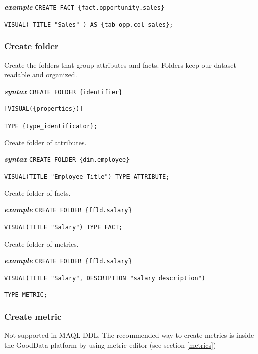 \documentclass[a4paper, 12pt, titlepage, fleqn]{article}
\begin{document}
\textbf{\emph{example}}  \hspace{.9cm}\verb=CREATE FACT {fact.opportunity.sales}=

\hspace{2.5cm}\verb=VISUAL( TITLE "Sales" ) AS {tab_opp.col_sales};=

\subsubsection{Create folder}
Create the folders that group attributes and facts. Folders keep our dataset readable and organized.

\textbf{\emph{syntax}}  \hspace{.9cm}\verb=CREATE FOLDER {identifier}=

\hspace{2.1cm}\verb=[VISUAL({properties})]=

\hspace{2.1cm}\verb=TYPE {type_identificator};=

\noindent Create folder of attributes.

\textbf{\emph{syntax}}  \hspace{.9cm}\verb=CREATE FOLDER {dim.employee}=

\hspace{2.2cm}\verb=VISUAL(TITLE "Employee Title") TYPE ATTRIBUTE;=

\noindent Create folder of facts.

\textbf{\emph{example}}  \hspace{.9cm}\verb=CREATE FOLDER {ffld.salary}=

\hspace{2.5cm}\verb=VISUAL(TITLE "Salary") TYPE FACT;=

\noindent  Create folder of metrics.

\textbf{\emph{example}}  \hspace{.9cm}\verb=CREATE FOLDER {ffld.salary}=

\hspace{2.5cm}\verb=VISUAL(TITLE "Salary", DESCRIPTION "salary description")=

\hspace{2.5cm}\verb=TYPE METRIC;=

\subsubsection{Create metric}
Not supported in MAQL DDL. The recommended way to create metrics is inside the GoodData platform by using metric editor (see section \ref{metrics})
\end{document}
